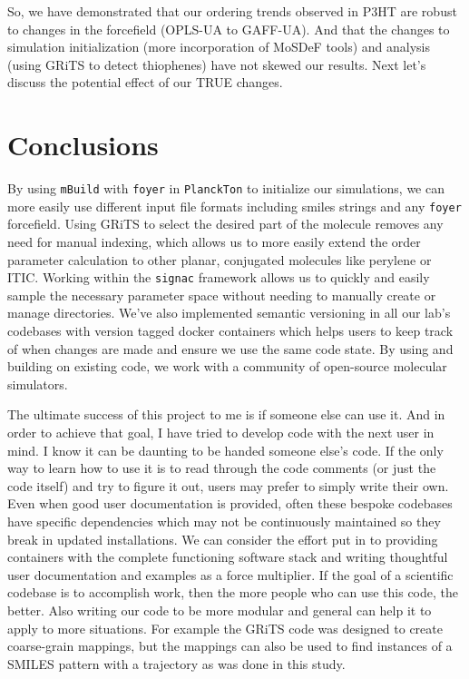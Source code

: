 So, we have demonstrated that our ordering trends observed in P3HT are robust to changes in the forcefield (OPLS-UA to GAFF-UA). And that the changes to simulation initialization (more incorporation of MoSDeF tools) and analysis (using GRiTS to detect thiophenes) have not skewed our results. Next let's discuss the potential effect of our TRUE changes.

\section{Conclusions}

By using  \texttt{mBuild} with \texttt{foyer} in \texttt{PlanckTon} to initialize our simulations, we can more easily use different input file formats including smiles strings and any \texttt{foyer} forcefield. 
Using GRiTS to select the desired part of the molecule removes any need for manual indexing, which allows us to more easily extend the order parameter calculation to other planar, conjugated molecules like perylene or ITIC.
Working within the \texttt{signac} framework allows us to quickly and easily sample the necessary parameter space without needing to manually create or manage directories. 
We've also implemented semantic versioning in all our lab's codebases with version tagged docker containers which helps users to keep track of when changes are made and ensure we use the same code state.
By using and building on existing code, we work with a community of open-source molecular simulators. 

The ultimate success of this project to me is if someone else can use it. 
And in order to achieve that goal, I have tried to develop code with the next user in mind.
I know it can be daunting to be handed someone else's code. 
If the only way to learn how to use it is to read through the code comments (or just the code itself) and try to figure it out, users may prefer to simply write their own. 
Even when good user documentation is provided, often these bespoke codebases have specific dependencies which may not be continuously maintained so they break in updated installations.
We can consider the effort put in to providing containers with the complete functioning software stack and writing thoughtful user documentation and examples as a force multiplier. 
If the goal of a scientific codebase is to accomplish work, then the more people who can use this code, the better.
Also writing our code to be more modular and general can help it to apply to more situations. 
For example the GRiTS code was designed to create coarse-grain mappings, but the mappings can also be used to find instances of a SMILES pattern with a trajectory as was done in this study.

